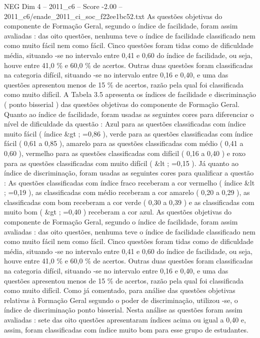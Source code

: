 \begin{textsample}{NEG Dim 4 – 2011\_c6 – Score -2.00 – 2011\_c6/enade\_2011\_ci\_soc\_f22ee1bc52.txt}
As questões objetivas do componente de Formação Geral, segundo o índice de facilidade, foram assim avaliadas : das oito questões, nenhuma teve o índice de facilidade classificado nem como muito fácil nem como fácil.
Cinco questões foram tidas como de dificuldade média, situando -se no intervalo entre 0,41 e 0,60 do índice de facilidade, ou seja, houve entre 41,0 \% e 60,0 \% de acertos.
Outras duas questões foram classificadas na categoria difícil, situando -se no intervalo entre 0,16 e 0,40, e uma das questões apresentou menos de 15 \% de acertos, razão pela qual foi classificada como muito difícil.
A Tabela 3.5 apresenta os índices de facilidade e discriminação ( ponto bisserial ) das questões objetivas do componente de Formação Geral.
Quanto ao índice de facilidade, foram usadas as seguintes cores para diferenciar o nível de dificuldade da questão : Azul para as questões classificadas com índice muito fácil ( índice \&gt ; =0,86 ), verde para as questões classificadas com índice fácil ( 0,61 a 0,85 ), amarelo para as questões classificadas com médio ( 0,41 a 0,60 ), vermelho para as questões classificadas com difícil ( 0,16 a 0,40 ) e roxo para as questões classificadas com muito difícil ( \&lt ; =0,15 ).
Já quanto ao índice de discriminação, foram usadas as seguintes cores para qualificar a questão : As questões classificadas com índice fraco receberam a cor vermelho ( índice \&lt ; =0,19 ), as classificadas com médio receberam a cor amarelo ( 0,20 a 0,29 ), as classificadas com bom receberam a cor verde ( 0,30 a 0,39 ) e as classificadas com muito bom ( \&gt ; =0,40 ) receberam a cor azul.
As questões objetivas do componente de Formação Geral, segundo o índice de facilidade, foram assim avaliadas : das oito questões, nenhuma teve o índice de facilidade classificado nem como muito fácil nem como fácil.
Cinco questões foram tidas como de dificuldade média, situando -se no intervalo entre 0,41 e 0,60 do índice de facilidade, ou seja, houve entre 41,0 \% e 60,0 \% de acertos.
Outras duas questões foram classificadas na categoria difícil, situando -se no intervalo entre 0,16 e 0,40, e uma das questões apresentou menos de 15 \% de acertos, razão pela qual foi classificada como muito difícil.
Como já comentado, para análise das questões objetivas relativas à Formação Geral segundo o poder de discriminação, utilizou -se, o índice de discriminação ponto bisserial.
Nesta análise as questões foram assim avaliadas : sete das oito questões apresentaram índices acima ou igual a 0,40 e, assim, foram classificadas com índice muito bom para esse grupo de estudantes.

\end{textsample}

